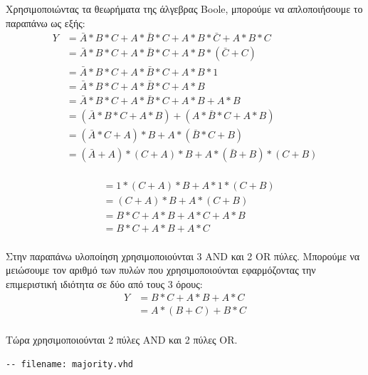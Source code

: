 \documentclass[]{article}
\begin{document}
Χρησιμοποιώντας τα θεωρήματα της άλγεβρας Boole, μπορούμε να απλοποιήσουμε το παραπάνω ως εξής:
\begin{align*}
	Y & = \bar{A} * B * C + A * \bar{B} * C + A * B * \bar{C} + A * B * C \\
	  & = \bar{A} * B * C + A * \bar{B} * C + A * B * (\bar{C} + C)       \\
	  & = \bar{A} * B * C + A * \bar{B} * C + A * B * 1                   \\
	  & = \bar{A} * B * C + A * \bar{B} * C + A * B                       \\
	  & = \bar{A} * B * C + A * \bar{B} * C + A * B + A * B               \\
	  & = (\bar{A} * B * C + A * B) + (A * \bar{B} * C + A * B)           \\
	  & = (\bar{A} * C + A) * B + A * (\bar{B} * C + B)                   \\
	  & = (\bar{A} + A) * (C + A) * B + A * (\bar{B} + B) * (C + B)       \\
\end{align*}

\begin{align*}
	 & = 1 * (C + A) * B + A * 1 * (C + B) \\
	 & = (C + A) * B + A * (C + B)         \\
	 & = B * C + A * B + A * C + A * B     \\
	 & = B * C + A * B + A * C             \\
\end{align*}

Στην παραπάνω υλοποίηση χρησιμοποιούνται 3 AND και 2 OR πύλες. Μπορούμε να μειώσουμε τον αριθμό των πυλών που χρησιμοποιούνται εφαρμόζοντας την επιμεριστική ιδιότητα σε δύο από τους 3 όρους:
\begin{align*}
	Y & = B * C + A * B + A * C \\
	  & = A * (B + C) + B * C   \\
\end{align*}

Τώρα χρησιμοποιούνται 2 πύλες AND και 2 πύλες OR.
\begin{verbatim}
-- filename: majority.vhd
\end{verbatim}
\inputminted{vhdl}{./assign_1/majority_old.vhdl}
\end{document}
